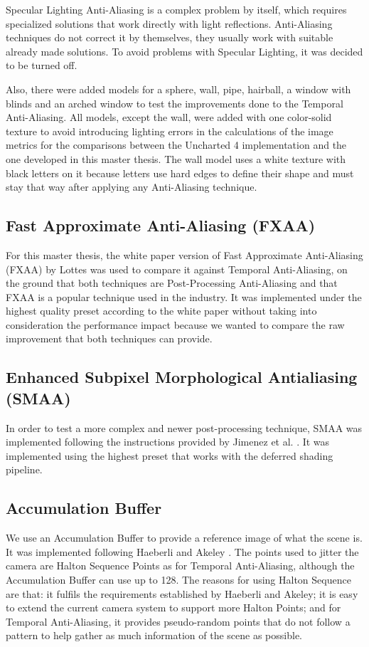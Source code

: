 \documentclass{cslthse-msc}
\begin{document}
Specular Lighting Anti-Aliasing is a complex problem by itself, which requires specialized solutions that work directly with light reflections. Anti-Aliasing techniques do not correct it by themselves, they usually work with suitable already made solutions. To avoid problems with Specular Lighting, it was decided to be turned off.

Also, there were added models for a sphere, wall, pipe, hairball, a window with blinds and an arched window to test the improvements done to the Temporal Anti-Aliasing. All models, except the wall, were added with one color-solid texture to avoid introducing lighting errors in the calculations of the image metrics for the comparisons between the Uncharted 4 implementation and the one developed in this master thesis. The wall model uses a white texture with black letters on it because letters use hard edges to define their shape and must stay that way after applying any Anti-Aliasing technique.

\subsection{Fast Approximate Anti-Aliasing (FXAA)}
For this master thesis, the white paper version of Fast Approximate Anti-Aliasing (FXAA) by Lottes \cite{Lottes2009} was used to compare it against Temporal Anti-Aliasing, on the ground that both techniques are Post-Processing Anti-Aliasing and that FXAA is a popular technique used in the industry. It was implemented  under the highest quality preset according to the white paper without taking into consideration the performance impact because we wanted to compare the raw improvement that both techniques can provide.

\subsection{Enhanced Subpixel Morphological Antialiasing (SMAA)}
In order to test a more complex and newer post-processing technique, SMAA was implemented following the instructions provided by Jimenez et al. \cite{Jimenez2012}. It was implemented using the highest     preset that works with the deferred shading pipeline.

\subsection{Accumulation Buffer}
We use an Accumulation Buffer to provide a reference image of what the scene is. It was implemented following Haeberli and Akeley \cite{Haeberli1990}. The points used to jitter the camera are Halton Sequence Points as for Temporal Anti-Aliasing, although the Accumulation Buffer can use up to 128. The reasons for using Halton Sequence are that: it fulfils the requirements established by Haeberli and Akeley; it is easy to extend the current camera system to support more Halton Points; and for Temporal Anti-Aliasing, it provides pseudo-random points that do not follow a pattern to help gather as much information of the scene as possible.
\end{document}
